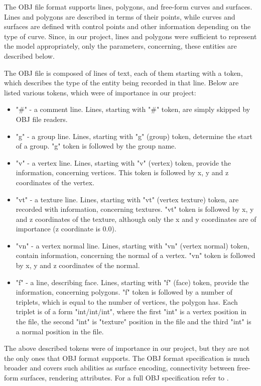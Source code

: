 \documentclass[times, 10pt,twocolumn]{article}
\begin{document}
The OBJ file format supports lines, polygons, and free-form curves and surfaces. Lines and polygons are described in terms of their points, while curves and surfaces are defined with control points and other information depending on the type of curve. Since, in our project, lines and polygons were sufficient to represent the model appropriately, only the parameters, concerning, these entities are described below.

The OBJ file is composed of lines of text, each of them starting with a token, which describes the type of the entity being  recorded in that line. Below are listed various tokens, which were of importance in our project:

\begin{itemize}
\item "\#" - a comment line. Lines, starting with "\#" token, are simply skipped by OBJ file readers.
\item "g" - a group line. Lines, starting with "g" (group) token, determine the start of a group. "g" token is followed by the group name.
\item "v" - a vertex line. Lines, starting with "v" (vertex) token, provide the information, concerning vertices. This token is followed by x, y and z coordinates of the vertex.
\item "vt" - a texture line. Lines, starting with "vt" (vertex texture) token, are recorded with information, concerning textures. "vt" token is followed by x, y and z coordinates of the texture, although only the x and y coordinates are of importance (z coordinate is 0.0).
\item "vn" - a vertex normal line. Lines, starting with "vn" (vertex normal) token, contain information, concerning the normal of a vertex. "vn" token is followed by x, y and z coordinates of the normal.
\item "f" - a line, describing face. Lines, starting with "f" (face) token, provide the information, concerning polygons. "f" token is followed by a number of triplets, which is equal to the number of vertices, the polygon has. Each triplet is of a form "int/int/int", where the first "int" is a vertex position in the file, the second "int" is "texture" position in the file and the third "int" is a normal position in the file.
\end{itemize}

The above described tokens were of importance in our project, but they are not the only ones that OBJ format supports. The OBJ format specification is much broader and covers such abilities as surface encoding, connectivity between free-form surfaces, rendering attributes. For a full OBJ specification refer to \cite{ex17}.
\end{document}
